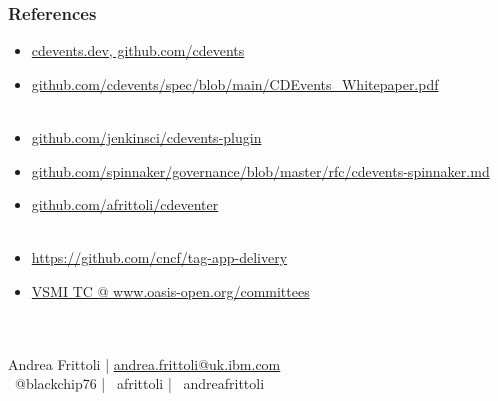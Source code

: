 \documentclass[aspectratio=169,11pt,hyperref={colorlinks=true}]{beamer}
\begin{document}
\begin{blackframe}
  \frametitle{References}
  \begin{itemize}
    \item \href{https://cdevents.dev}{cdevents.dev, github.com/cdevents}
    \item \href{https://github.com/cdevents/spec/blob/main/CDEvents_Whitepaper.pdf}{github.com/cdevents/spec/blob/main/CDEvents\_Whitepaper.pdf} \\~
    \item \href{https://github.com/jenkinsci/cdevents-plugin}{github.com/jenkinsci/cdevents-plugin}
    \item \href{https://github.com/spinnaker/governance/blob/master/rfc/cdevents-spinnaker.md}{github.com/spinnaker/governance/blob/master/rfc/cdevents-spinnaker.md}
    \item \href{https://github.com/afrittoli/cdeventer}{github.com/afrittoli/cdeventer} \\~
    \item \href{github.com/cncf/tag-app-delivery}{https://github.com/cncf/tag-app-delivery}
    \item \href{https://www.oasis-open.org/committees/tc_home.php?wg_abbrev=vsmi}{VSMI TC @ www.oasis-open.org/committees}
  \end{itemize}
  ~\\
  ~\\
  Andrea Frittoli | \href{mailto:andrea.frittoli@uk.ibm.com}{andrea.frittoli@uk.ibm.com} \\
  \faTwitter ~@blackchip76 | \faGithub ~afrittoli | \faLinkedin ~andreafrittoli
\end{blackframe}
\end{document}
